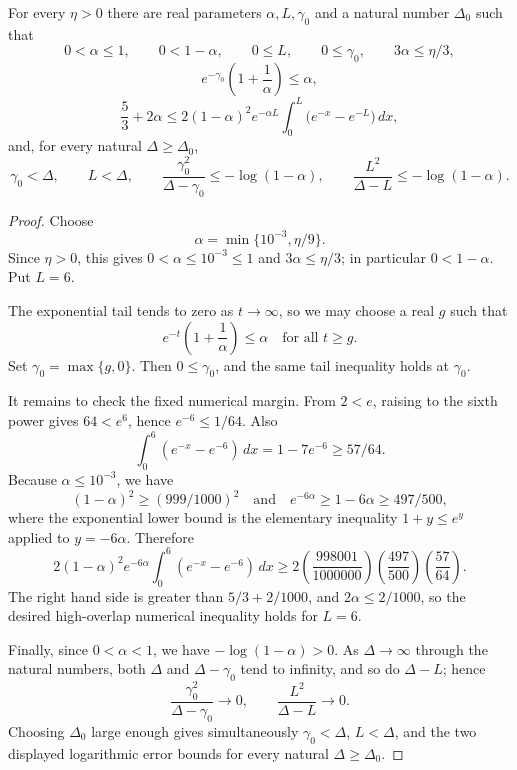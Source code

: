 \begin{helper}
For every $\eta>0$ there are real parameters $\alpha,L,\gamma_0$ and a
natural number $\Delta_0$ such that
\[
0<\alpha\le 1,\qquad 0<1-\alpha,\qquad 0\le L,\qquad 0\le\gamma_0,
\qquad 3\alpha\le \eta/3,
\]
\[
e^{-\gamma_0}\left(1+\frac1\alpha\right)\le\alpha,
\]
\[
\frac53+2\alpha\le
2(1-\alpha)^2 e^{-\alpha L}
\int_0^L\bigl(e^{-x}-e^{-L}\bigr)\,dx,
\]
and, for every natural $\Delta\ge\Delta_0$,
\[
\gamma_0<\Delta,\qquad L<\Delta,\qquad
\frac{\gamma_0^2}{\Delta-\gamma_0}\le-\log(1-\alpha),\qquad
\frac{L^2}{\Delta-L}\le-\log(1-\alpha).
\]
\end{helper}
\begin{proof}
Choose
\[
\alpha=\min\{10^{-3},\eta/9\}.
\]
Since $\eta>0$, this gives $0<\alpha\le10^{-3}\le1$ and
$3\alpha\le\eta/3$; in particular $0<1-\alpha$.  Put $L=6$.

The exponential tail tends to zero as $t\to\infty$, so we may choose a real
$g$ such that
\[
e^{-t}\left(1+\frac1\alpha\right)\le \alpha
\quad\text{for all }t\ge g .
\]
Set $\gamma_0=\max\{g,0\}$.  Then $0\le\gamma_0$, and the same tail
inequality holds at $\gamma_0$.

It remains to check the fixed numerical margin.  From
$2<e$, raising to the sixth power gives $64<e^6$, hence
$e^{-6}\le 1/64$.  Also
\[
\int_0^6 (e^{-x}-e^{-6})\,dx
=1-7e^{-6}\ge 57/64.
\]
Because $\alpha\le10^{-3}$, we have
\[
(1-\alpha)^2\ge (999/1000)^2
\quad\text{and}\quad
e^{-6\alpha}\ge 1-6\alpha\ge 497/500,
\]
where the exponential lower bound is the elementary inequality
$1+y\le e^y$ applied to $y=-6\alpha$.  Therefore
\[
2(1-\alpha)^2e^{-6\alpha}
\int_0^6(e^{-x}-e^{-6})\,dx
\ge
2\left(\frac{998001}{1000000}\right)
\left(\frac{497}{500}\right)
\left(\frac{57}{64}\right).
\]
The right hand side is greater than $5/3+2/1000$, and
$2\alpha\le2/1000$, so the desired high-overlap numerical inequality holds
for $L=6$.

Finally, since $0<\alpha<1$, we have $-\log(1-\alpha)>0$.  As
$\Delta\to\infty$ through the natural numbers, both $\Delta$ and
$\Delta-\gamma_0$ tend to infinity, and so do $\Delta-L$; hence
\[
\frac{\gamma_0^2}{\Delta-\gamma_0}\to0,
\qquad
\frac{L^2}{\Delta-L}\to0.
\]
Choosing $\Delta_0$ large enough gives simultaneously
$\gamma_0<\Delta$, $L<\Delta$, and the two displayed logarithmic error
bounds for every natural $\Delta\ge\Delta_0$.
\end{proof}
